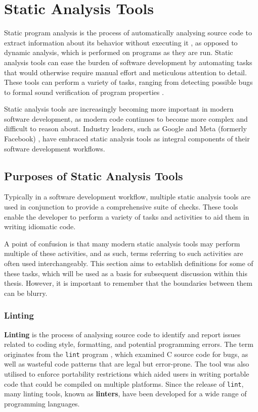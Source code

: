 \chapter{Static Analysis Tools}

Static program analysis is the process of automatically analysing source code to extract information about its behavior without executing it , as opposed to dynamic analysis, which is performed on programs as they are run.
Static analysis tools can ease the burden of software development by automating tasks that would otherwise require manual effort and meticulous attention to detail.
These tools can perform a variety of tasks, ranging from detecting possible bugs \cite{johnson_lint_1978,hovemeyer_finding-bugs_2004} to formal sound verification of program properties \cite{blanchet_static-analyzer_2003}.

Static analysis tools are increasingly becoming more important in modern software development, as modern code continues to become more complex and difficult to reason about.
Industry leaders, such as Google \cite{sadowski_analysis-google_2018} and Meta (formerly Facebook) \cite{calcagno_moving-facebook_2015}, have embraced static analysis tools as integral components of their software development workflows.


\section{Purposes of Static Analysis Tools}
Typically in a software development workflow, multiple static analysis tools are used in conjunction to provide a comprehensive suite of checks. %
These tools enable the developer to perform a variety of tasks and activities to aid them in writing idiomatic code.

A point of confusion is that many modern static analysis tools may perform multiple of these activities, and as such, terms referring to such activities are often used interchangeably.
This section aims to establish definitions for some of these tasks, which will be used as a basis for subsequent discussion within this thesis.
However, it is important to remember that the boundaries between them can be blurry.

\subsection{Linting}
\textbf{Linting} is the process of analysing source code to identify and report issues related to coding style, formatting, and potential programming errors.
The term originates from the \texttt{lint} program \cite{johnson_lint_1978}, which examined C source code for bugs, as well as wasteful code patterns that are legal but error-prone.
The tool was also utilised to enforce portability restrictions which aided users in writing portable code that could be compiled on multiple platforms.
Since the release of \texttt{lint}, many linting tools, known as \textbf{linters}, have been developed for a wide range of programming languages.

